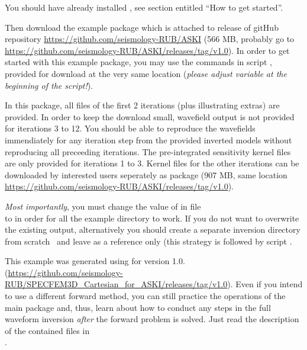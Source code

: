 You should have already installed \ASKI{}, see section entitled ``How to get started''. 

Then download the example
package  which is attached to release  
of gitHub repository \url{https://github.com/seismology-RUB/ASKI} (566 MB, probably go to 
\url{https://github.com/seismology-RUB/ASKI/releases/tag/v1.0}).
In order to get started with this example package, you may use the commands in script
, provided for download at the very same location
(\emph{please adjust variable}  \emph{at the beginning of the script!}).

In this package, all files of the first 2 iterations (plus illustrating extras) are provided. 
In order to keep the download small, wavefield output is not provided  for
iterations 3 to 12. You should be able to reproduce the wavefields immendiately for any iteration step
from the provided inverted models without reproducing all preceeding iterations. 
The pre-integrated sensitivity kernel files are only provided for
iterations 1 to 3. Kernel files for the other iterations can be downloaded by
interested users seperately as package 
(907 MB, same location \url{https://github.com/seismology-RUB/ASKI/releases/tag/v1.0}).

\emph{Most importantly}, you must change the value of 
in file\\
 to
 in order for all the example directory to work. 
If you do not want to overwrite the existing output, alternatively you 
should create a separate inversion directory from scratch~
 and leave 
as a reference only (this strategy is followed by script . 

This example was generated using  for \ASKI{} version 1.0.
(\url{https://github.com/seismology-RUB/SPECFEM3D_Cartesian_for_ASKI/releases/tag/v1.0}).
Even if you intend
to use a different forward method, you can still practice the operations of the main \ASKI{}
package and, thus, learn about how to conduct any steps in
the full waveform inversion \emph{after} the forward problem is solved. Just read the description
of the contained files in \\
.


